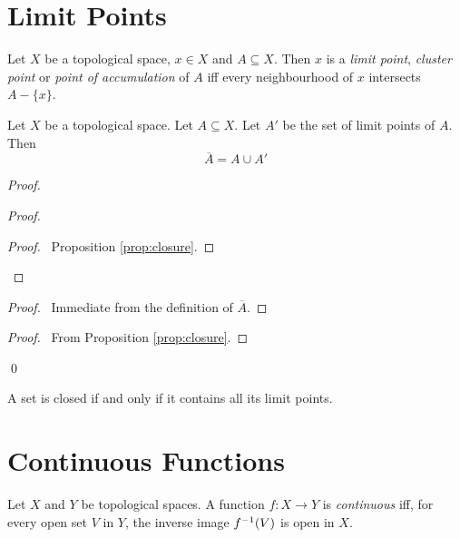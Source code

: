 \section{Limit Points}

\begin{df}
Let $X$ be a topological space, $x \in X$ and $A \subseteq X$. Then $x$ is a \emph{limit point}, \emph{cluster point} or \emph{point of accumulation} of $A$ iff every neighbourhood of $x$ intersects $A - \{x\}$.
\end{df}

\begin{prop}
Let $X$ be a topological space. Let $A \subseteq X$. Let $A'$ be the set of limit points of $A$. Then
\[ \overline{A} = A \cup A' \]
\end{prop}

\begin{proof}
\pf
{}
\begin{proof}
	\begin{proof}
		\pf\ Proposition \ref{prop:closure}.
	\end{proof}
\end{proof}
\begin{proof}
	\pf\ Immediate from the definition of $\overline{A}$.
\end{proof}
\begin{proof}
	\pf\ From Proposition \ref{prop:closure}.
\end{proof}
\qed
\end{proof}

\begin{cor}
A set is closed if and only if it contains all its limit points.
\end{cor}

\section{Continuous Functions}

\begin{df}[Continuous]
Let $X$ and $Y$ be topological spaces. A function $f : X \rightarrow Y$ is \emph{continuous} iff, for every open set $V$ in $Y$, the inverse image ${f}^{-1}(V)$ is open in $X$.
\end{df}

